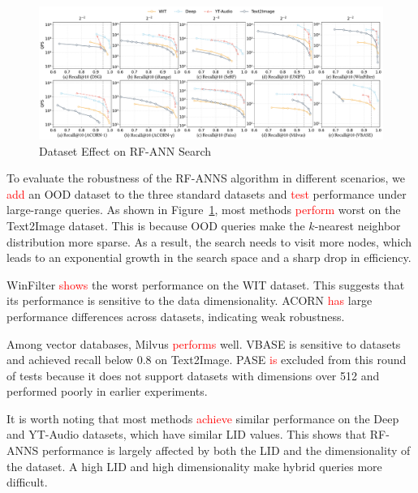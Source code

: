 \documentclass[sigconf, nonacm]{acmart}
\begin{document}
	\begin{figure}[htbp]
		\centering
		    \setlength{\abovecaptionskip}{0cm}
		    \setlength{\belowcaptionskip}{-0.5cm}
		\includegraphics[width=\textwidth]{figures/exp/exp_8_3.pdf}
		\caption{Dataset Effect on RF-ANN Search}
		\label{fig:exp_8_3}
	\end{figure}
	
To evaluate the robustness of the RF-ANNS algorithm in different scenarios, we \textcolor{red}{add} an OOD dataset to the three standard datasets and \textcolor{red}{test} performance under large-range queries. As shown in Figure~\ref{fig:exp_8_3}, most methods \textcolor{red}{perform} worst on the Text2Image dataset. This is because OOD queries make the $k$-nearest neighbor distribution more sparse. As a result, the search needs to visit more nodes, which leads to an exponential growth in the search space and a sharp drop in efficiency.

WinFilter \textcolor{red}{shows} the worst performance on the WIT dataset. This suggests that its performance is sensitive to the data dimensionality. ACORN \textcolor{red}{has} large performance differences across datasets, indicating weak robustness.

Among vector databases, Milvus \textcolor{red}{performs} well. VBASE is sensitive to datasets and achieved recall below 0.8 on Text2Image. PASE \textcolor{red}{is} excluded from this round of tests because it does not support datasets with dimensions over 512 and performed poorly in earlier experiments.

It is worth noting that most methods \textcolor{red}{achieve} similar performance on the Deep and YT-Audio datasets, which have similar LID values. This shows that RF-ANNS performance is largely affected by both the LID and the dimensionality of the dataset. A high LID and high dimensionality make hybrid queries more difficult.
\end{document}
